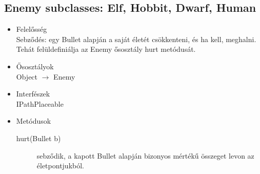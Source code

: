 \subsection{Enemy subclasses: Elf, Hobbit, Dwarf, Human}
\begin{itemize}
\item Felelősség\\
Sebződés: egy Bullet alapján a saját életét csökkenteni, és ha kell, meghalni. Tehát felüldefiniálja az Enemy ősosztály hurt metódusát.
\item Ősosztályok\\
Object $\rightarrow$ Enemy
\item Interfészek\\
IPathPlaceable

\item Metódusok\\
	\begin{description}
		\item[hurt(Bullet b)] sebződik, a kapott Bullet alapján bizonyos mértékű összeget levon az életpontjukból.
		
	\end{description}
\end{itemize}



